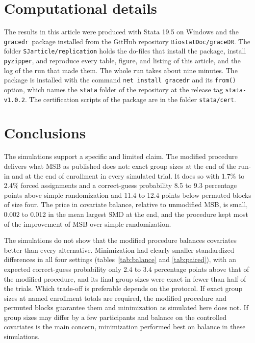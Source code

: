 \documentclass[bib]{statapress}
\newcommand{\gracedr}{\texttt{gracedr}}
\begin{document}
\section{Computational details}

The results in this article were produced with Stata 19.5 on Windows and the
\gracedr\ package installed from the GitHub repository
\texttt{BiostatDoc/graceDR}. The folder
\texttt{SJarticle/}\allowbreak\texttt{replication} holds the do-files that
install the package, install \texttt{pyzipper}, and reproduce every table,
figure, and listing of this article, and the log of the run that made them. The
whole run takes about nine minutes. The package is installed with the command
\texttt{net install gracedr} and its \texttt{from()} option, which names the
\texttt{stata} folder of the repository at the release tag \texttt{stata-v1.0.2}. The
certification scripts of the package are in the folder \texttt{stata/cert}.

\section{Conclusions}
\label{sec:conclusions}

The simulations support a specific and limited claim. The modified procedure
delivers what MSB as published does not: exact group sizes at the end of the
run-in and at the end of enrollment in every simulated trial. It does so with
1.7\% to 2.4\% forced assignments and a correct-guess probability 8.5 to 9.3
percentage points above simple randomization and 11.4 to 12.4 points below
permuted blocks of size four. The price in covariate balance, relative to
unmodified MSB, is small, 0.002 to 0.012 in the mean largest SMD at the end, and
the procedure kept most of the improvement of MSB over simple randomization.

The simulations do not show that the modified procedure balances covariates
better than every alternative. Minimization had clearly smaller standardized
differences in all four settings (tables~\ref{tab:balance} and
\ref{tab:paired}), with an expected correct-guess probability only 2.4 to 3.4
percentage points above that of the modified procedure, and its final group
sizes were exact in fewer than half of the trials. Which trade-off is preferable
depends on the protocol. If exact group sizes at named enrollment totals are
required, the modified procedure and permuted blocks guarantee them and
minimization as simulated here does not. If group sizes may differ by a few
participants and balance on the controlled covariates is the main concern,
minimization performed best on balance in these simulations.
\end{document}

